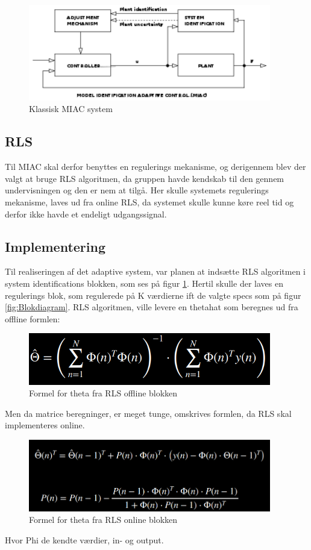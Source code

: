\begin{figure}[H]
	\centering
	\includegraphics[width = 300pt]{figur/MIAC}
	\caption{Klassisk MIAC system}
	\label{fig:MIAC}
\end{figure}

\subsection{RLS}
Til MIAC skal derfor benyttes en regulerings mekanisme, og derigennem blev der valgt at bruge RLS algoritmen, da gruppen havde kendskab til den gennem undervisningen og den er nem at tilgå. Her skulle systemets regulerings mekanisme, laves ud fra online RLS, da systemet skulle kunne køre reel tid og derfor ikke havde et endeligt udgangssignal. 

\subsection{Implementering}
Til realiseringen af det adaptive system, var planen at indsætte RLS algoritmen i system identifications blokken, som ses på figur \ref{fig:MIAC}. Hertil skulle der laves en regulerings blok, som regulerede på K værdierne ift de valgte specs som på figur \ref{fig:Blokdiagram}.
RLS algoritmen, ville levere en thetahat som beregnes ud fra offline formlen:

\begin{figure}[H]
	\centering
	\includegraphics[width = 300pt]{figur/theta_formel}
	\caption{Formel for theta fra RLS offline blokken}
	\label{fig:theta_formel}
\end{figure}
Men da matrice beregninger, er meget tunge, omskrives formlen, da RLS skal implementeres online. 
 \begin{figure}[H]
	\centering
	\includegraphics[width = 300pt]{figur/RLS_formel}
	\caption{Formel for theta fra RLS online blokken}
	\label{fig:RLS_formel}
\end{figure}
Hvor Phi de kendte værdier, in- og output. 
     